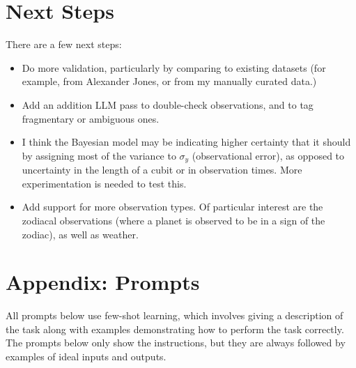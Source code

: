 \documentclass{article}
\begin{document}
\section{Next Steps}
There are a few next steps:
\begin{itemize}
    \item Do more validation, particularly by comparing to existing datasets (for example, from Alexander Jones, or from my manually curated data.)
    \item Add an addition LLM pass to double-check observations, and to tag fragmentary or ambiguous ones.
    \item I think the Bayesian model may be indicating higher certainty that it should by assigning most of the variance to $\sigma_y$ (observational error), as opposed to uncertainty in the length of a cubit or in observation times. More experimentation is needed to test this.
    \item Add support for more observation types. Of particular interest are the zodiacal observations (where a planet is observed to be in a sign of the zodiac), as well as weather.
\end{itemize}

\medskip

\printbibliography

\section{Appendix: Prompts}
All prompts below use few-shot learning, which involves giving a description of the task along with examples demonstrating how to perform the task correctly. The prompts below only show the instructions, but they are always followed by examples of ideal inputs and outputs.
\end{document}
